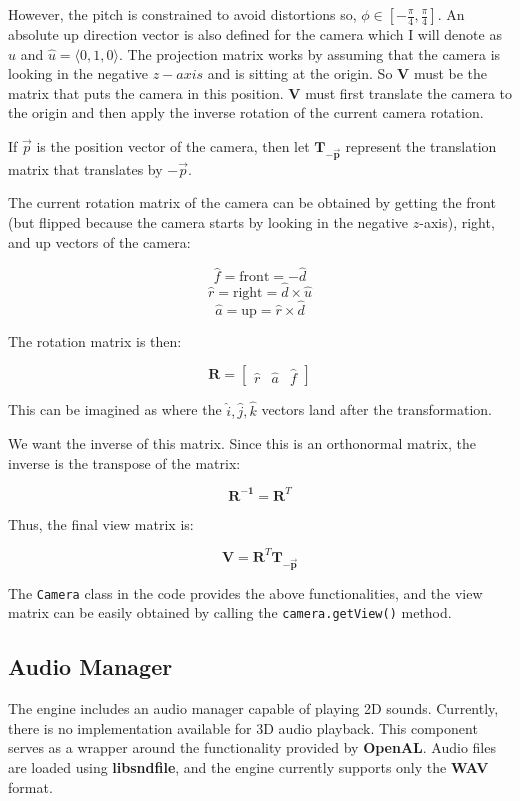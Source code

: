 However, the pitch is constrained to avoid distortions so, $\phi \in [-\frac{\pi}{4}, \frac{\pi}{4}]$. An absolute up direction vector is also defined for the camera which I will denote as $\hat{u}$ and $\hat{u}=\langle0, 1, 0\rangle$. The projection matrix works by assuming that the camera is looking in the negative $z-axis$ and is sitting at the origin. So $\mathbf{V}$ must be the matrix that puts the camera in this position. $\mathbf{V}$ must first translate the camera to the origin and then apply the inverse rotation of the current camera rotation.

If $\vec{p}$ is the position vector of the camera, then let $\mathbf{T_{-\overrightarrow{p}}}$ represent the translation matrix that translates by $-{\vec{p}}$.


The current rotation matrix of the camera can be obtained by getting the front (but flipped because the camera starts by looking in the negative $z$-axis), right, and up vectors of the camera:

\[
\hat{f} = \text{front} = -\hat{d}
\]
\[
\hat{r} = \text{right} = \hat{d} \times \hat{u}
\]
\[
\hat{a} = \text{up} = \hat{r} \times \hat{d}
\]

The rotation matrix is then:

\[
\mathbf{R} = \begin{bmatrix} 
\hat{r} & \hat{a} & \hat{f} 
\end{bmatrix}
\]

This can be imagined as where the $\hat{i}, \hat{j}, \hat{k}$ vectors land after the transformation.

We want the inverse of this matrix. Since this is an orthonormal matrix, the inverse is the transpose of the matrix:

\[
\mathbf{R^{-1}} = \mathbf{R}^T
\]

Thus, the final view matrix is:

\[
\mathbf{V} = \mathbf{R}^T \mathbf{T}_{-\mathbf{\overrightarrow{p}}}
\]


The \texttt{Camera} class in the code provides the above functionalities, and the view matrix can be easily obtained by calling the \texttt{camera.getView()} method.

\subsection{Audio Manager}

The engine includes an audio manager capable of playing 2D sounds. Currently, there is no implementation available for 3D audio playback. This component serves as a wrapper around the functionality provided by \textbf{OpenAL}. Audio files are loaded using \textbf{libsndfile}, and the engine currently supports only the \textbf{WAV} format.

